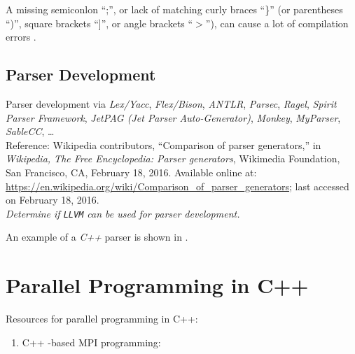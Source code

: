 	A missing semiconlon ``;'', or lack of matching curly braces ``\}'' (or parentheses ``)'', square brackets ``]'', or angle brackets ``$>$''), can cause a lot of compilation errors \cite{Husted2000}.






\subsection{Parser Development}
\label{ssec:ParserDevelopment}

Parser development via {\it Lex/Yacc}, {\it Flex/Bison}, {\it ANTLR}, {\it Parsec}, {\it Ragel}, {\it Spirit Parser Framework}, {\it JetPAG (Jet Parser Auto-Generator)}, {\it Monkey}, {\it MyParser}, {\it SableCC}, \dots \\

	Reference: Wikipedia contributors, ``Comparison of parser generators,'' in {\it Wikipedia, The Free Encyclopedia: Parser generators}, Wikimedia Foundation, San Francisco, CA, February 18, 2016. Available online at: \url{https://en.wikipedia.org/wiki/Comparison_of_parser_generators}; last accessed on February 18, 2016. \\

{\it Determine if {\tt LLVM} can be used for parser development.}


An example of a {\it C++} parser is shown in \cite[Chp. 40, pp. 959--993]{Schildt1998a}.











\section{Parallel Programming in C++}
\label{sec:ParallelProgrammingInCpp}


Resources for parallel programming in C++: \vspace{-0.3cm}
\begin{enumerate} \itemsep -4pt
\item C++ -based MPI programming: \cite{Karniadakis2003}
\end{enumerate}











